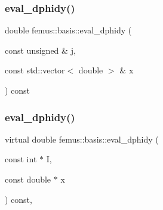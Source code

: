 \mbox{\label{classfemus_1_1basis_a3c65ece3b826c56b2a05b2221e9ac61f}} 
\subsubsection{\texorpdfstring{eval\+\_\+dphidy()}{eval\_dphidy()}\hspace{0.1cm}{\footnotesize\ttfamily [1/2]}}
{\footnotesize\ttfamily double femus\+::basis\+::eval\+\_\+dphidy (\begin{DoxyParamCaption}\item[{const unsigned \&}]{j,  }\item[{const std\+::vector$<$ double $>$ \&}]{x }\end{DoxyParamCaption}) const\hspace{0.3cm}{\ttfamily [inline]}}

\mbox{\label{classfemus_1_1basis_a2819fac9aae797156b9efec8a0b85cc1}} 
\subsubsection{\texorpdfstring{eval\+\_\+dphidy()}{eval\_dphidy()}\hspace{0.1cm}{\footnotesize\ttfamily [2/2]}}
{\footnotesize\ttfamily virtual double femus\+::basis\+::eval\+\_\+dphidy (\begin{DoxyParamCaption}\item[{const int $\ast$}]{I,  }\item[{const double $\ast$}]{x }\end{DoxyParamCaption}) const\hspace{0.3cm}{\ttfamily [inline]}, {\ttfamily [virtual]}}



